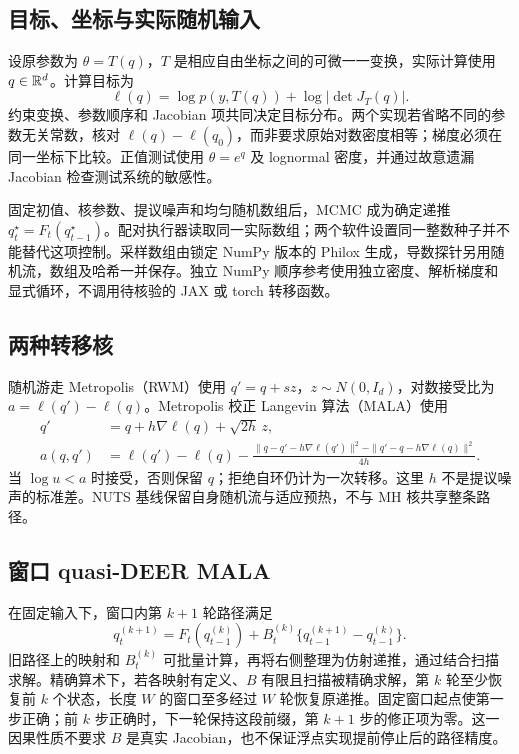 \subsection{目标、坐标与实际随机输入}
设原参数为 $\theta=T(q)$，$T$ 是相应自由坐标之间的可微一一变换，实际计算使用 $q\in\mathbb R^d$。计算目标为
\begin{equation}\label{eq:target}
\ell(q)=\log p(y,T(q))+\log|\det J_T(q)|.
\end{equation}
约束变换、参数顺序和 Jacobian 项共同决定目标分布。两个实现若省略不同的参数无关常数，核对 $\ell(q)-\ell(q_0)$，而非要求原始对数密度相等；梯度必须在同一坐标下比较。正值测试使用 $\theta=e^q$ 及 lognormal 密度，并通过故意遗漏 Jacobian 检查测试系统的敏感性。

固定初值、核参数、提议噪声和均匀随机数组后，MCMC 成为确定递推 $q_t^\star=F_t(q_{t-1}^\star)$。配对执行器读取同一实际数组；两个软件设置同一整数种子并不能替代这项控制。采样数组由锁定 NumPy 版本的 Philox 生成，导数探针另用随机流，数组及哈希一并保存。独立 NumPy 顺序参考使用独立密度、解析梯度和显式循环，不调用待核验的 JAX 或 torch 转移函数。

\subsection{两种转移核}
随机游走 Metropolis（RWM）使用 $q'=q+s z$，$z\sim N(0,I_d)$，对数接受比为 $a=\ell(q')-\ell(q)$。Metropolis 校正 Langevin 算法（MALA）使用
\begin{align}
q'&=q+h\nabla\ell(q)+\sqrt{2h}\,z,\\
a(q,q')&=\ell(q')-\ell(q)-
\frac{\|q-q'-h\nabla\ell(q')\|^2-\|q'-q-h\nabla\ell(q)\|^2}{4h}.
\end{align}
当 $\log u<a$ 时接受，否则保留 $q$；拒绝自环仍计为一次转移。这里 $h$ 不是提议噪声的标准差。NUTS 基线保留自身随机流与适应预热，不与 MH 核共享整条路径。

\subsection{窗口 quasi-DEER MALA}
在固定输入下，窗口内第 $k+1$ 轮路径满足
\begin{equation}\label{eq:deer}
q_t^{(k+1)}=F_t(q_{t-1}^{(k)})+
B_t^{(k)}\{q_{t-1}^{(k+1)}-q_{t-1}^{(k)}\}.
\end{equation}
旧路径上的映射和 $B_t^{(k)}$ 可批量计算，再将右侧整理为仿射递推，通过结合扫描求解。精确算术下，若各映射有定义、$B$ 有限且扫描被精确求解，第 $k$ 轮至少恢复前 $k$ 个状态，长度 $W$ 的窗口至多经过 $W$ 轮恢复原递推\cite{gonzalez,zoltowski}。固定窗口起点使第一步正确；前 $k$ 步正确时，下一轮保持这段前缀，第 $k+1$ 步的修正项为零。这一因果性质不要求 $B$ 是真实 Jacobian，也不保证浮点实现提前停止后的路径精度。

